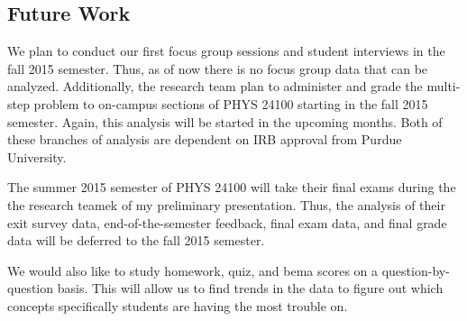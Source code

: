 \subsection{Future Work}

We plan to conduct our first focus group sessions and student interviews in the fall 2015 semester. Thus, as of now there is no focus group data that can be analyzed. Additionally, the research team plan to administer and grade the multi-step problem to on-campus sections of PHYS 24100 starting in the fall 2015 semester. Again, this analysis will be started in the upcoming months. Both of these branches of analysis are dependent on IRB approval from Purdue University.

The summer 2015 semester of PHYS 24100 will take their final exams during the the research teamek of my preliminary presentation. Thus, the analysis of their exit survey data, end-of-the-semester feedback, final exam data, and final grade data will be deferred to the fall 2015 semester.

We would also like to study homework, quiz, and \gls{bema} scores on a question-by-question basis. This will allow us to find trends in the data to figure out which concepts specifically students are having the most trouble on.


